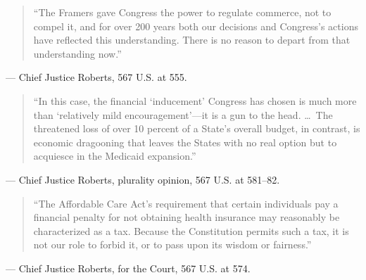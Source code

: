 \documentclass[12pt]{article}
\begin{document}
\begin{quote}
``The Framers gave Congress the power to regulate commerce, not to compel it, and for over 200 years both our decisions and Congress's actions have reflected this understanding. There is no reason to depart from that understanding now.''
\end{quote}
\noindent --- Chief Justice Roberts, 567 U.S. at 555.

\begin{quote}
``In this case, the financial `inducement' Congress has chosen is much more than `relatively mild encouragement'---it is a gun to the head. \ldots\ The threatened loss of over 10 percent of a State's overall budget, in contrast, is economic dragooning that leaves the States with no real option but to acquiesce in the Medicaid expansion.''
\end{quote}
\noindent --- Chief Justice Roberts, plurality opinion, 567 U.S. at 581--82.

\begin{quote}
``The Affordable Care Act's requirement that certain individuals pay a financial penalty for not obtaining health insurance may reasonably be characterized as a tax. Because the Constitution permits such a tax, it is not our role to forbid it, or to pass upon its wisdom or fairness.''
\end{quote}
\noindent --- Chief Justice Roberts, for the Court, 567 U.S. at 574.
\end{document}
